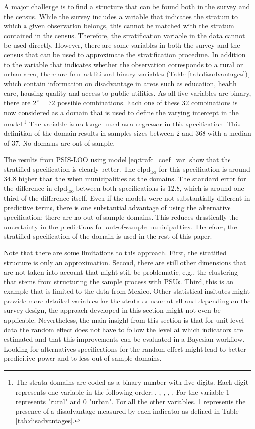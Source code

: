 A major challenge is to find a structure that can be found both in the survey and the census.
While the survey includes a variable that indicates the stratum to which a given observation belongs, this cannot be matched with the stratum contained in the census.
Therefore, the stratification variable in the data cannot be used directly.
However, there are some variables in both the survey and the census that can be used to approximate the stratification procedure.
In addition to the  variable that indicates whether the observation corresponds to a rural or urban area, there are four additional binary variables (Table \ref{tab:disadvantages}), which contain information on disadvantage in areas such as education, health care, housing quality and access to public utilities.
As all five variables are binary, there are $2^5 = 32$ possible combinations.
Each one of these 32 combinations is now considered as a domain that is used to define the varying intercept in the model.\footnote{The strata domains are coded as a binary number with five digits. Each digit represents one variable in the following order: , , , , . For the  variable 1 represents "rural" and 0 "urban". For all the other variables, 1 represents the presence of a disadvantage measured by each indicator as defined in Table \ref{tab:disadvantages}.}
The variable  is no longer used as a regressor in this specification.
This definition of the domain results in samples sizes between 2 and 368 with a median of 37.
No domains are out-of-sample.

The results from PSIS-LOO using model \ref{eq:trafo_coef_var} show that the stratified specification is clearly better. The elpd$_{\text{loo}}$ for this specification is around 34.8 higher than the when municipalities as the domains. The standard error for the difference in elpd$_{\text{loo}}$ between both specifications is 12.8, which is around one third of the difference itself.
Even if the models were not substantially different in predictive terms, there is one substantial advantage of using the alternative specification: there are no out-of-sample domains.
This reduces drastically the uncertainty in the predictions for out-of-sample municipalities.
Therefore, the stratified specification of the domain is used in the rest of this paper.

Note that there are some limitations to this approach.
First, the stratified structure is only an approximation.
Second, there are still other dimensions that are not taken into account that might still be problematic, e.g., the clustering that stems from structuring the sample process with PSUs.
Third, this is an example that is limited to the data from Mexico.
Other statistical insitutes might provide more detailed variables for the strata or none at all and depending on the survey design, the approach developed in this section might not even be applicable.
Nevertheless, the main insight from this section is that for unit-level data the random effect does not have to follow the level at which indicators are estimated and that this improvements can be evaluated in a Bayesian workflow.
Looking for alternatives specifications for the random effect might lead to better predicitive power and to less out-of-sample domains.